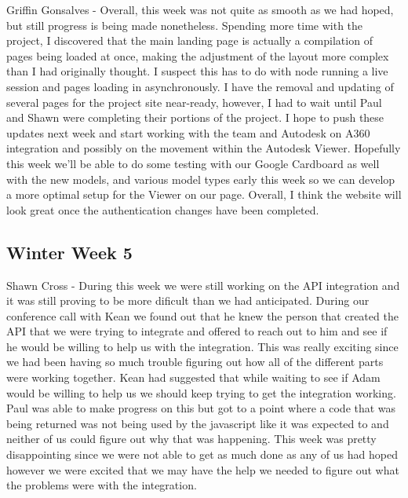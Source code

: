 \documentclass[10pt,draftclsnofoot,onecolumn]{IEEEtran}
\begin{document}
Griffin Gonsalves - Overall, this week was not quite as smooth as we had hoped, but still progress is being made nonetheless. Spending more time with the project, I discovered that the main landing page is actually a compilation of pages being loaded at once, making the adjustment of the layout more complex than I had originally thought. I suspect this has to do with node running a live session and pages loading in asynchronously. I have the removal and updating of several pages for the project site near-ready, however, I had to wait until Paul and Shawn were completing their portions of the project. I hope to push these updates next week and start working with the team and Autodesk on A360 integration and possibly on the movement within the Autodesk Viewer. Hopefully this week we'll be able to do some testing with our Google Cardboard as well with the new models, and various model types early this week so we can develop a more optimal setup for the Viewer on our page. Overall, I think the website will look great once the authentication changes have been completed.
\subsection{Winter Week 5}
Shawn Cross - During this week we were still working on the API integration and it was still proving to be more dificult than we had anticipated. During our conference call with Kean we found out that he knew the person that created the API that we were trying to integrate and offered to reach out to him and see if he would be willing to help us with the integration. This was really exciting since we had been having so much trouble figuring out how all of the different parts were working together. Kean had suggested that while waiting to see if Adam would be willing to help us we should keep trying to get the integration working. Paul was able to make progress on this but got to a point where a code that was being returned was not being used by the javascript like it was expected to and neither of us could figure out why that was happening. This week was pretty disappointing since we were not able to get as much done as any of us had hoped however we were excited that we may have the help we needed to figure out what the problems were with the integration. 
\end{document}
